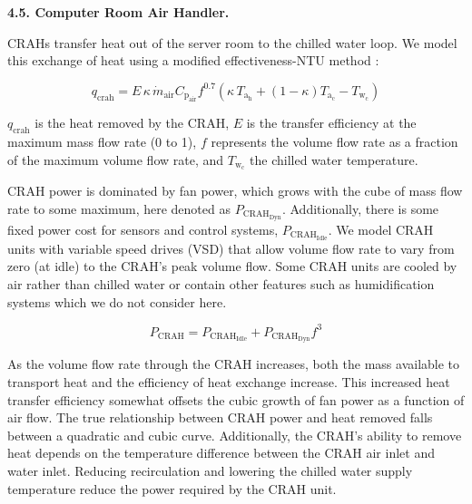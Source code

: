 {\bf 4.5. Computer Room Air Handler.} 

CRAHs transfer heat out of the server room to the chilled water loop.  We model this exchange of heat using a modified effectiveness-NTU method \cite{Cengel03}:

\begin{equation}
q_{\mathrm{crah}} = E \, \kappa  \,\dot{m}_{\mathrm{air}} C_{\mathrm{p}_\mathrm{air}} f^{0.7} (\kappa \, T_{\mathrm{a}_\mathrm{h}} + (1-\kappa) T_{\mathrm{a}_\mathrm{c}} - T_{\mathrm{w}_\mathrm{c}})
\end{equation}

$q_{\mathrm{crah}}$ is the heat removed by the CRAH, $E$ is the transfer efficiency at the maximum mass flow rate (0 to 1), $f$ represents the volume flow rate as a fraction of the maximum volume flow rate, and $T_{\mathrm{w}_\mathrm{c}}$ the chilled water temperature.

CRAH power is dominated by fan power, which grows with the cube of mass flow rate to some maximum, here denoted as $P_{\mathrm{CRAH}_{\mathrm{Dyn}}}$.
Additionally, there is some fixed power cost for sensors and control systems, $P_{\mathrm{CRAH}_{\mathrm{Idle}}}$.  We model CRAH units with variable speed drives (VSD) that allow volume flow rate to vary from zero (at idle) to the CRAH's peak volume flow.  Some CRAH units are cooled by air rather than chilled water or contain other features such as humidification systems which we do not consider here.

\begin{equation}
P_{\mathrm{CRAH}} = P_{\mathrm{CRAH}_{\mathrm{Idle}}} +  P_{\mathrm{CRAH}_{\mathrm{Dyn}}} f^3
\end{equation}

As the volume flow rate through the CRAH increases, both the mass available to transport heat and the efficiency of heat exchange increase. This increased heat transfer efficiency somewhat offsets the cubic growth of fan power as a function of air flow.  The true relationship between CRAH power and heat removed falls between a quadratic and cubic curve.
Additionally, the CRAH's ability to remove heat depends on the temperature difference between the CRAH air inlet and water inlet. Reducing recirculation and lowering the chilled water supply temperature reduce the power required by the CRAH unit.%





